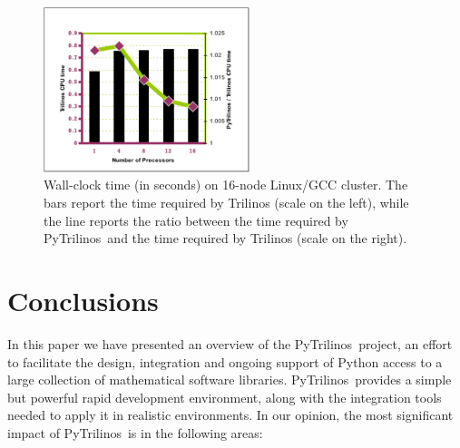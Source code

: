 \documentclass{llncs}
\newcommand{\PyTrilinos}{{\sc PyTrilinos}}
\begin{document}
\begin{figure}
  \begin{center}
    \includegraphics[width=6cm]{scalability-1k}
    \caption{Wall-clock time (in seconds) on 16-node Linux/GCC cluster.
      The bars report the time required by Trilinos (scale on the
      left), while the line reports the ratio between the time
      required by \PyTrilinos\ and the time required by Trilinos (scale
      on the right).}
    \label{fig:time_parallel_matvec}
  \end{center}
\end{figure}

\section{Conclusions}
\label{sec:discussion}

In this paper we have presented an overview of the
\PyTrilinos\ project, an effort to facilitate the design, integration
and ongoing support of Python access to a large collection of
mathematical software libraries.  \PyTrilinos\ provides a simple but
powerful rapid development environment, along with the integration
tools needed to apply it in realistic environments.  In our opinion,
the most significant impact of \PyTrilinos\ is in the following areas:
\end{document}
